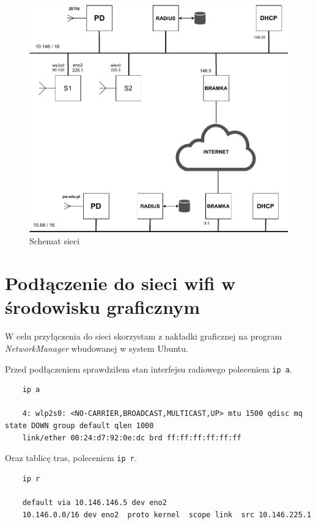 \documentclass{article} %
\begin{document}
\begin{figure}[H]
  \centering
  \includegraphics[width=\textwidth]{SchematSieci}
  
  \caption{Schemat sieci}
  \label{fig:SchematSieci}
\end{figure}

\newpage{}
\section{Podłączenie do sieci wifi w środowisku graficznym}
W celu przyłączenia do sieci skorzystam z nakładki graficznej na program \textit{NetworkManager} wbudowanej w system Ubuntu.
\vspace{5 mm}

Przed podłączeniem sprawdziłem stan interfejsu radiowego poleceniem \texttt{ip~a}.
\begin{lstlisting}
    ip a

    4: wlp2s0: <NO-CARRIER,BROADCAST,MULTICAST,UP> mtu 1500 qdisc mq state DOWN group default qlen 1000
    link/ether 00:24:d7:92:0e:dc brd ff:ff:ff:ff:ff:ff
\end{lstlisting}

Oraz tablicę tras, poleceniem \texttt{ip r}.
\begin{lstlisting}
    ip r 

    default via 10.146.146.5 dev eno2
    10.146.0.0/16 dev eno2  proto kernel  scope link  src 10.146.225.1
\end{lstlisting}
\end{document}
